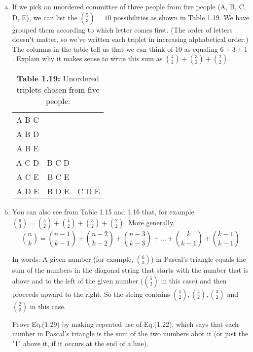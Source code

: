 \begin{enumerate}[(a)]
    \item If we pick an unordered committee of three people from five people (A, B, C, D, E),
        we can list the $\binom{5}{3} = 10$ possibilities as shown in Table 1.19.
        We have grouped them according to which letter comes first. (The order of letters
        doesn't matter, so we've written each triplet in increasing alphabetical order.)
        The columns in the table tell us that we can think of $10$ as equaling $6 + 3+ 1$.
        Explain why it makes sense to write this sum as  $\binom{4}{2} + \binom{3}{2} + \binom{2}{2}$.

        \begin{table}[h]
            \centering
            \begin{tabular}{ccc}
                A B C & & \\ 
                A B D & & \\
                A B E & & \\
                A C D & B C D & \\
                A C E & B C E & \\
                A D E & B D E & C D E \\
            \end{tabular}
            \caption*{\textbf{Table 1.19:} Unordered triplets chosen from five people.}
        \end{table}

    \item You can also see from Table 1.15 and 1.16 that, for example 
        $\binom{6}{3} = \binom{5}{2} + \binom{4}{2} + \binom{3}{2} + \binom{2}{2}$.
    More generally,
    \begin{equation*}\tag{1.29}
        \binom{n}{k} = \binom{n - 1}{k - 1} + \binom{n - 2}{k - 2} + \binom{n - 3}{k - 3} + \ldots + 
                        \binom{k}{k - 1} + \binom{k - 1}{k - 1}
    \end{equation*}

    In words: A given number (for example, $\binom{6}{3}$) in Pascal's triangle equals the sum
    of the numbers in the diagonal string that starts with the number that is above and to the 
    left of the given number ($\binom{5}{2}$ in this case) and then proceeds upward to the right.
    So the string contains $\binom{5}{2}, \binom{4}{2}, \binom{3}{2}$ and $\binom{2}{2}$
    in this case.

    Prove Eq.(1.29) by making repeated use of Eq.(1.22), which says that each number in Pascal's
    triangle is the sum of the two numbers abot it (or just the "1" above it, if it occurs at the end 
    of a line).
\end{enumerate}

